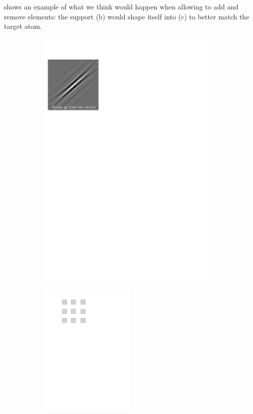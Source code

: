  shows an example of what we think would happen when allowing to add and remove elements: the support (b) would shape itself into (c) to better match the target atom.

\begin{figure}[!ht]\centering
\begin{subfigure}[b]{0.32\textwidth}\centering
	\includegraphics[width=\textwidth]{figures/manual-better-support/target.pdf}
	\caption{}\label{fig_fixed_vs_expected_y}
\end{subfigure}
\begin{subfigure}[b]{0.32\textwidth}\centering
	\includegraphics[width=0.5\textwidth]{figures/manual-better-support/support.pdf}

\end{subfigure}
\end{figure}
